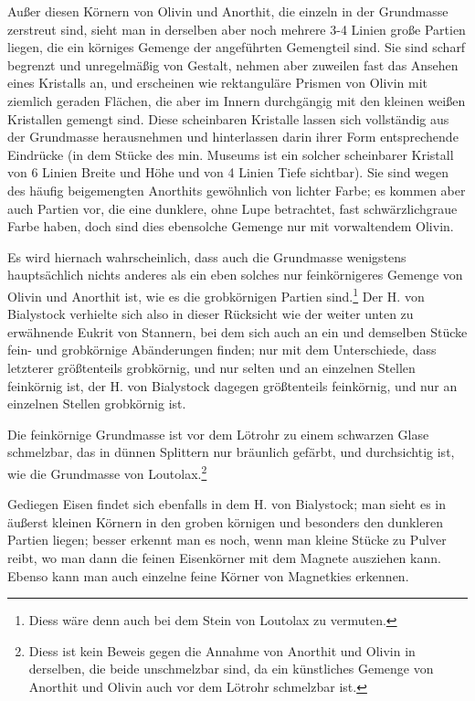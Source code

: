 \documentclass[a4paper, 11pt, oneside]{article}
\begin{document}
Außer diesen Körnern von Olivin und Anorthit, die einzeln in der Grundmasse zerstreut sind, sieht man in derselben aber noch mehrere 3-4 Linien große Partien liegen, die ein körniges Gemenge der angeführten Gemengteil sind. Sie sind scharf begrenzt und unregelmäßig von Gestalt, nehmen aber zuweilen fast das Ansehen eines Kristalls an, und erscheinen wie rektanguläre Prismen von Olivin mit ziemlich geraden Flächen, die aber im Innern durchgängig mit den kleinen weißen Kristallen gemengt sind. Diese scheinbaren Kristalle lassen sich vollständig aus der Grundmasse herausnehmen und hinterlassen darin ihrer Form entsprechende Eindrücke (in dem Stücke des min. Museums ist ein solcher scheinbarer Kristall von 6 Linien Breite und Höhe und von 4 Linien Tiefe sichtbar). Sie sind wegen des häufig beigemengten Anorthits gewöhnlich von lichter Farbe; es kommen aber auch Partien vor, die eine dunklere, ohne Lupe betrachtet, fast schwärzlichgraue Farbe haben, doch sind dies ebensolche Gemenge nur mit vorwaltendem Olivin.

Es wird hiernach wahrscheinlich, dass auch die Grundmasse wenigstens hauptsächlich nichts anderes als ein eben solches nur feinkörnigeres Gemenge von Olivin und Anorthit ist, wie es die grobkörnigen Partien sind.\footnote{Diess wäre denn auch bei dem Stein von Loutolax zu vermuten.} Der H. von Bialystock verhielte sich also in dieser Rücksicht wie der weiter unten zu erwähnende Eukrit von Stannern, bei dem sich auch an ein und demselben Stücke fein- und grobkörnige Abänderungen finden; nur mit dem Unterschiede, dass letzterer größtenteils grobkörnig, und nur selten und an einzelnen Stellen feinkörnig ist, der H. von Bialystock dagegen größtenteils feinkörnig, und nur an einzelnen Stellen grobkörnig ist.

Die feinkörnige Grundmasse ist vor dem Lötrohr zu einem schwarzen Glase schmelzbar, das in dünnen Splittern nur bräunlich gefärbt, und durchsichtig ist, wie die Grundmasse von Loutolax.\footnote{Diess ist kein Beweis gegen die Annahme von Anorthit und Olivin in derselben, die beide unschmelzbar sind, da ein künstliches Gemenge von Anorthit und Olivin auch vor dem Lötrohr schmelzbar ist.}

Gediegen Eisen findet sich ebenfalls in dem H. von Bialystock; man sieht es in äußerst kleinen Körnern in den groben körnigen und besonders den dunkleren Partien liegen; besser erkennt man es noch, wenn man kleine Stücke zu Pulver reibt, wo man dann die feinen Eisenkörner mit dem Magnete ausziehen kann. Ebenso kann man auch einzelne feine Körner von Magnetkies erkennen.
\end{document}
